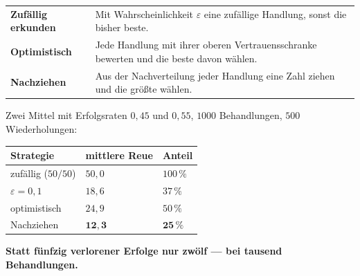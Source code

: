 \begin{merksatz}
\begin{center}
{\small
\renewcommand{\arraystretch}{1.55}
\begin{tabular}{@{}P{2.8cm}P{5.8cm}@{}}
\toprule
\textbf{Zufällig erkunden} & Mit Wahrscheinlichkeit $\varepsilon$ eine zufällige Handlung, sonst die bisher beste.\\
\textbf{Optimistisch} & Jede Handlung mit ihrer oberen Vertrauensschranke bewerten und die beste davon wählen.\\
\textbf{Nachziehen} & Aus der Nachverteilung jeder Handlung eine Zahl ziehen und die größte wählen.\\
\bottomrule
\end{tabular}}
\end{center}

Zwei Mittel mit Erfolgsraten $0{,}45$ und $0{,}55$, $1000$ Behandlungen, $500$ Wiederholungen:

\begin{center}
{\small
\renewcommand{\arraystretch}{1.5}
\begin{tabular}{@{}P{3.0cm}P{2.4cm}P{2.4cm}@{}}
\toprule
\textbf{Strategie} & \textbf{mittlere Reue} & \textbf{Anteil}\\
\midrule
zufällig ($50/50$) & $50{,}0$ & $100\,\%$\\
$\varepsilon = 0{,}1$ & $18{,}6$ & $37\,\%$\\
optimistisch & $24{,}9$ & $50\,\%$\\
Nachziehen & $\mathbf{12{,}3}$ & $\mathbf{25\,\%}$\\
\bottomrule
\end{tabular}}
\end{center}

\begin{center}
\begin{minipage}{0.9\textwidth}
\textbf{Statt fünfzig verlorener Erfolge nur zwölf --- bei tausend Behandlungen.}
\end{minipage}
\end{center}

\begin{center}
\begin{minipage}{0.88\textwidth}
\end{minipage}
\end{center}
\end{merksatz}

